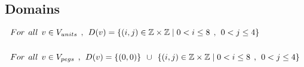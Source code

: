 \subsection{Domains}
\begin{align*}
&For \hspace{1ex} all \hspace{1ex} v \in V_{units} \hspace{1ex},\hspace{1ex} D(v)=\{(i,j) \in \mathbb{Z} \times \mathbb{Z}	\mid  0<i \leq 8 \hspace{1ex} , \hspace{1ex} 0<j \leq 4\}\\
\\
&For \hspace{1ex} all \hspace{1ex} v \in V_{pegs} \hspace{1ex},\hspace{1ex} D(v)=\{(0,0)\} \hspace{1ex} \cup \hspace{1ex}\{(i,j) \in \mathbb{Z} \times \mathbb{Z}\mid  0<i \leq 8 \hspace{1ex} , \hspace{1ex} 0<j \leq 4\}
\end{align*}
